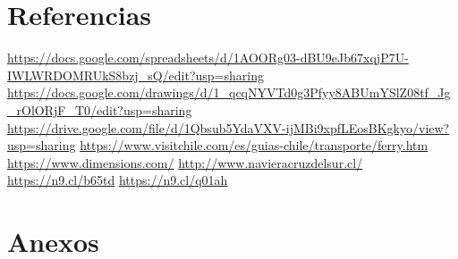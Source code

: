\documentclass[a4paper]{article}
\begin{document}
\newpage 
\section{Referencias}
\url{https://docs.google.com/spreadsheets/d/1AOORg03-dBU9eJb67xqjP7U-IWLWRDOMRUkS8bzj_sQ/edit?usp=sharing}\newline\newline
\url{https://docs.google.com/drawings/d/1_qcqNYVTd0g3Pfyy8ABUmYSlZ08tf_Jg_rOlORjF_T0/edit?usp=sharing}\newline\newline
\url{https://drive.google.com/file/d/1Qbsub5YdaVXV-ijMBi9xpfLEosBKgkyo/view?usp=sharing}\newline\newline
\url{https://www.visitchile.com/es/guias-chile/transporte/ferry.htm}\newline\newline
\url{https://www.dimensions.com/}\newline\newline
\url{http://www.navieracruzdelsur.cl/}\newline\newline
\url{https://n9.cl/b65td}\newline\newline
\url{https://n9.cl/q01ah}

\section{Anexos}
\end{document}
